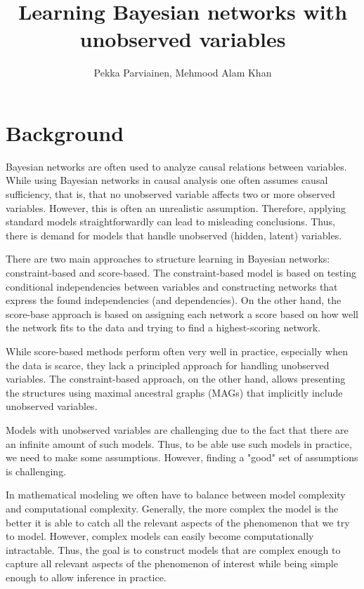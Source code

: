 \documentclass[]{article}
\begin{document}
\title{Learning Bayesian networks with unobserved variables}
\author{Pekka Parviainen, Mehmood Alam Khan}

\maketitle

\section{Background}

Bayesian networks are often used to analyze causal relations between variables. While using Bayesian networks in causal analysis one often assumes causal sufficiency, that is, that no unobserved variable affects two or more observed variables. However, this is often an unrealistic assumption. Therefore, applying standard models straightforwardly can lead to misleading conclusions. Thus, there is demand for models that handle unobserved (hidden, latent) variables.

There are two main approaches to structure learning in Bayesian networks: constraint-based and score-based. The constraint-based model is based on testing conditional independencies between variables and constructing networks that express the found independencies (and dependencies). On the other hand, the score-base approach is based on assigning each network a score based on how well the network fits to the data and trying to find a highest-scoring network. 

While score-based methods perform often very well in practice, especially when the data is scarce, they lack a principled approach for handling unobserved variables. The constraint-based approach, on the other hand, allows presenting the structures using maximal ancestral graphs (MAGs) that implicitly include unobserved variables. 

Models with unobserved variables are challenging due to the fact that there are an infinite amount of such models. Thus, to be able use such models in practice, we need to make some assumptions. However, finding a "good" set of assumptions is challenging.

In mathematical modeling we often have to balance between model complexity and computational complexity. Generally, the more complex the model is the better it is able to catch all the relevant aspects of the phenomenon that we try to model. However, complex models can easily become computationally intractable. Thus, the goal is to construct models that are complex enough to capture all relevant aspects of the phenomenon of interest while being simple enough to allow inference in practice.
\end{document}
